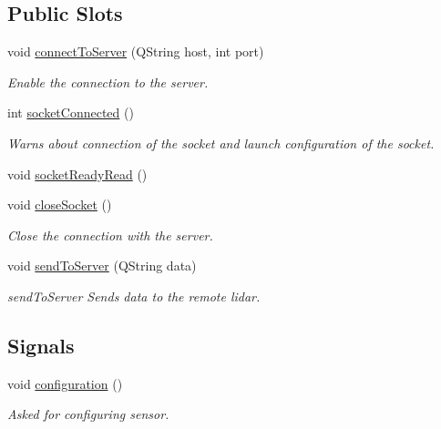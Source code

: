 \subsection*{Public Slots}
\begin{DoxyCompactItemize}
\item 
\hypertarget{classpacpus_1_1SickSocket_a922b5337d2eae8ae855720f781743833}{void \hyperlink{classpacpus_1_1SickSocket_a922b5337d2eae8ae855720f781743833}{connect\-To\-Server} (Q\-String host, int port)}\label{classpacpus_1_1SickSocket_a922b5337d2eae8ae855720f781743833}

\begin{DoxyCompactList}\small\item\em Enable the connection to the server. \end{DoxyCompactList}\item 
\hypertarget{classpacpus_1_1SickSocket_a8fb9f7cb3f60287b65aaef6cd850238c}{int \hyperlink{classpacpus_1_1SickSocket_a8fb9f7cb3f60287b65aaef6cd850238c}{socket\-Connected} ()}\label{classpacpus_1_1SickSocket_a8fb9f7cb3f60287b65aaef6cd850238c}

\begin{DoxyCompactList}\small\item\em Warns about connection of the socket and launch configuration of the socket. \end{DoxyCompactList}\item 
void \hyperlink{classpacpus_1_1SickSocket_ae839a7cf980638e2217a26b1580bd136}{socket\-Ready\-Read} ()
\item 
\hypertarget{classpacpus_1_1SickSocket_a472586eeb677eddb03551c1938078d45}{void \hyperlink{classpacpus_1_1SickSocket_a472586eeb677eddb03551c1938078d45}{close\-Socket} ()}\label{classpacpus_1_1SickSocket_a472586eeb677eddb03551c1938078d45}

\begin{DoxyCompactList}\small\item\em Close the connection with the server. \end{DoxyCompactList}\item 
void \hyperlink{classpacpus_1_1SickSocket_afde0ecc1860a02c55ff6d7964cdf7a3c}{send\-To\-Server} (Q\-String data)
\begin{DoxyCompactList}\small\item\em send\-To\-Server Sends data to the remote lidar. \end{DoxyCompactList}\end{DoxyCompactItemize}
\subsection*{Signals}
\begin{DoxyCompactItemize}
\item 
\hypertarget{classpacpus_1_1SickSocket_a9fdf4483ca1b800cba3bbf1f2086edce}{void \hyperlink{classpacpus_1_1SickSocket_a9fdf4483ca1b800cba3bbf1f2086edce}{configuration} ()}\label{classpacpus_1_1SickSocket_a9fdf4483ca1b800cba3bbf1f2086edce}

\begin{DoxyCompactList}\small\item\em Asked for configuring sensor. \end{DoxyCompactList}\end{DoxyCompactItemize}
